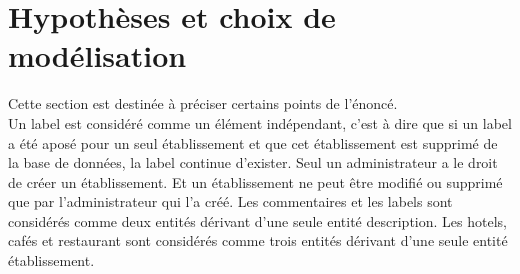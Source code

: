 \section{Hypothèses et choix de modélisation}
\noindent Cette section est destinée à préciser certains points de l'énoncé.\\
Un label est considéré comme un élément indépendant, c'est à dire que si un label a été aposé pour un seul établissement et que cet établissement est supprimé de la base de données, la label continue d'exister. Seul un administrateur a le droit de créer un établissement. Et un établissement ne peut être modifié ou supprimé que par l'administrateur qui l'a créé. Les commentaires et les labels sont considérés comme deux entités dérivant d'une seule entité description. Les hotels, cafés et restaurant sont considérés comme trois entités dérivant d'une seule entité établissement.